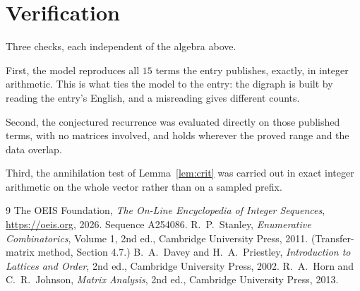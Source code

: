 \documentclass[11pt,a4paper]{article}
\theoremstyle{plain}
\theoremstyle{definition}
\begin{document}
\section{Verification}

Three checks, each independent of the algebra above.

First, the model reproduces all $15$ terms the entry publishes, exactly, in integer
arithmetic. This is what ties the model to the entry: the digraph is built by reading the
entry's English, and a misreading gives different counts.

Second, the conjectured recurrence was evaluated directly on those published terms, with no
matrices involved, and holds wherever the proved range and the data overlap.

Third, the annihilation test of Lemma~\ref{lem:crit} was carried out in exact integer
arithmetic on the whole vector rather than on a sampled prefix.

\begin{thebibliography}{9}
 The OEIS Foundation, \emph{The On-Line Encyclopedia of Integer
Sequences}, \url{https://oeis.org}, 2026. Sequence A254086.
 R.~P.~Stanley, \emph{Enumerative Combinatorics}, Volume 1, 2nd ed.,
Cambridge University Press, 2011. (Transfer-matrix method, Section 4.7.)
 B.~A.~Davey and H.~A.~Priestley, \emph{Introduction to Lattices and
Order}, 2nd ed., Cambridge University Press, 2002.
 R.~A.~Horn and C.~R.~Johnson, \emph{Matrix Analysis}, 2nd ed., Cambridge
University Press, 2013.
\end{thebibliography}
\end{document}
